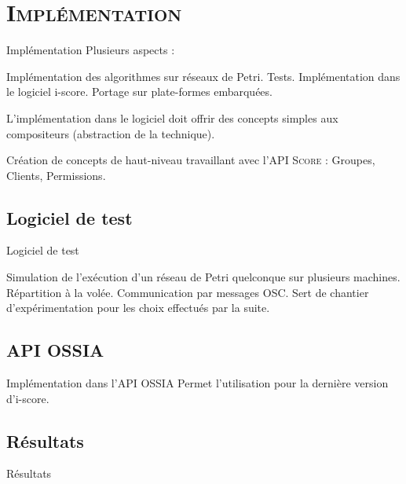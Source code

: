 \section{\scshape Implémentation}
\begin{frame}{Implémentation}
	Plusieurs aspects : 
	
	\begin{itemize}
		\itemar Implémentation des algorithmes sur réseaux de Petri.
		\itemar Tests.
		\itemar Implémentation dans le logiciel i-score.
		\itemar Portage sur plate-formes embarquées.
	\end{itemize}
	
	L'implémentation dans le logiciel doit offrir des concepts simples aux compositeurs (abstraction de la technique).
	
	\begin{itemize}
		\itemar Création de concepts de haut-niveau travaillant avec l'\textsc{API Score} : Groupes, Clients, Permissions.
	\end{itemize}
\end{frame}

\subsection{Logiciel de test}
\begin{frame}{Logiciel de test}
	\begin{itemize}
		\itemar Simulation de l'exécution d'un réseau de Petri quelconque sur plusieurs machines.
		\itemar Répartition à la volée.
		\itemar Communication par messages \textsc{OSC}.
		\itemar Sert de chantier d'expérimentation pour les choix effectués par la suite.
	\end{itemize}
	
\end{frame}

\subsection{API OSSIA}
\begin{frame}{Implémentation dans l'API OSSIA}
	Permet l'utilisation pour la dernière version d'i-score.
\end{frame}

\subsection{Résultats}
\begin{frame}{Résultats}

\end{frame}

